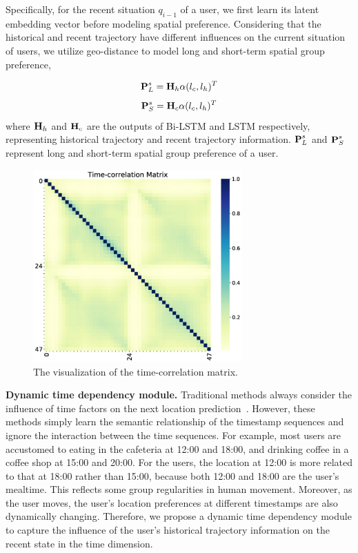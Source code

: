\documentclass[10pt,journal,compsoc]{IEEEtran}
\begin{document}
Specifically, for the recent situation $q_{i-1}$ of a user, we first learn its latent embedding vector before modeling spatial preference. Considering that the historical and recent trajectory have different influences on the current situation of users, we utilize geo-distance to model long and short-term spatial group preference,

\begin{equation}
    \bm{{\rm P}}^{s}_{L} = \bm{{\rm H}}_{h}\alpha(l_c,l_h)^{T}
\end{equation}
\begin{equation}
    \bm{{\rm P}}^{s}_{S} = \bm{{\rm H}}_{c}\alpha(l_c,l_h)^{T}
\end{equation}
where $\bm{{\rm H}}_h$ and $\bm{{\rm H}}_c$ are the outputs of Bi-LSTM and LSTM respectively, representing historical trajectory and recent trajectory information. $\bm{{\rm P}}^{s}_L$ and $\bm{{\rm P}}^{s}_S$ represent long and short-term spatial group preference of a user.

\begin{figure}[htpb]
    \centering
    \includegraphics[width=8cm]{figure/timetky_cor513.pdf}
    \caption{The visualization of the time-correlation matrix.}
    \label{fig.6}
\end{figure}

\textbf{Dynamic time dependency module.} Traditional methods always consider the influence of time factors on the next location prediction~\cite{feng2018deepmove,wu2020personalized}. However, these methods simply learn the semantic relationship of the timestamp sequences and ignore the interaction between the time sequences. For example, most users are accustomed to eating in the cafeteria at 12:00 and 18:00, and drinking coffee in a coffee shop at 15:00 and 20:00. For the users, the location at 12:00 is more related to that at 18:00 rather than 15:00, because both 12:00 and 18:00 are the user’s mealtime. This reflects some group regularities in human movement. Moreover, as the user moves, the user's location preferences at different timestamps are also dynamically changing. Therefore, we propose a dynamic time dependency module to capture the influence of the user's historical trajectory information on the recent state in the time dimension.
\end{document}
